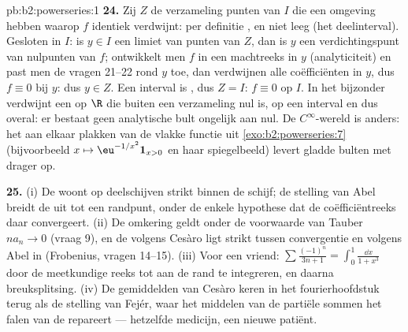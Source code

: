\begin{solution}{pb:b2:powerseries:1}
\textbf{24.} Zij $Z$ de verzameling punten van $I$ die een omgeving
hebben waarop $f$ identiek verdwijnt: per definitie , en niet
leeg (het deelinterval). Gesloten in $I$: is $y \in I$ een limiet
van punten van $Z$, dan is $y$ een verdichtingspunt van nulpunten
van $f$; ontwikkelt men $f$ in een machtreeks in $y$
(analyticiteit) en past men de vragen 21--22 rond $y$ toe, dan
verdwijnen alle coëfficiënten in $y$, dus $f \equiv 0$ bij $y$: dus
$y \in Z$. Een interval is , dus $Z = I$: $f \equiv 0$
op $I$. In het bijzonder verdwijnt een  op $\R$
die buiten een  verzameling nul is, op een interval en dus
overal: er bestaat geen analytische bult ongelijk aan nul. De
$C^\infty$-wereld is anders: het aan elkaar plakken van de vlakke
functie uit \cref{exo:b2:powerseries:7} (bijvoorbeeld $x \mapsto
\eu^{-1/x^2}\mathbf 1_{x>0}$ en haar spiegelbeeld) levert gladde
bulten met  drager op.

\textbf{25.} (i) De  woont op 
deelschijven strikt binnen de schijf; de stelling van Abel breidt
de  uit tot een randpunt, onder de enkele hypothese dat
de coëfficiëntreeks daar convergeert. (ii) De omkering geldt onder
de voorwaarde van Tauber $na_n \to 0$ (vraag 9), en de
 volgens Cesàro ligt strikt tussen convergentie en
 volgens Abel in (Frobenius, vragen 14--15). (iii)
Voor een vriend: $\sum\frac{(-1)^n}{3n+1} = \int_0^1\frac{\dd
x}{1+x^3}$ door de meetkundige reeks tot aan de rand te
integreren, en daarna breuksplitsing. (iv) De gemiddelden van
Cesàro keren in het fourierhoofdstuk terug als de stelling van
Fejér, waar het middelen van de partiële sommen het falen van de
 repareert --- hetzelfde medicijn, een
nieuwe patiënt.
\end{solution}
